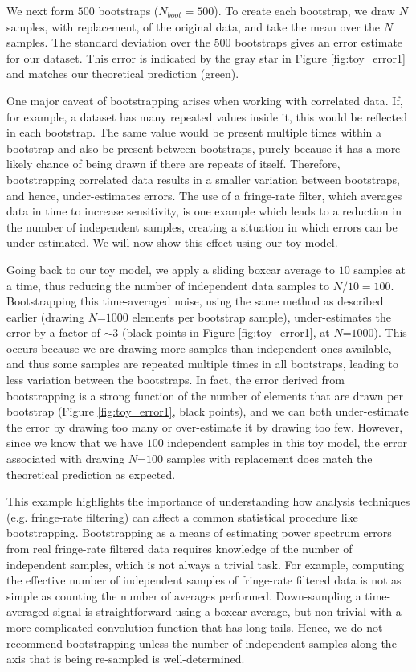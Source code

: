 \documentclass[preprint2,numberedappendix,tighten]{aastex6}  %
\begin{document}
We next form $500$ bootstraps ($N_{boot} = 500$). To create each bootstrap, we draw $N$ samples, with replacement, of the 
original data, and take the mean over the $N$ samples. The standard deviation over the $500$ bootstraps gives an error 
estimate for our dataset. This error is indicated by the gray star in Figure \ref{fig:toy_error1} and matches our theoretical 
prediction (green).

One major caveat of bootstrapping arises when working with correlated data. If, for example, a dataset has many repeated 
values inside it, this would be reflected in each bootstrap. The same value would be present multiple times within a bootstrap 
and also be present between bootstraps, purely because it has a more likely chance of being drawn if there are repeats of 
itself. Therefore, bootstrapping correlated data results in a smaller variation between bootstraps, and hence, under-estimates 
errors. The use of a fringe-rate filter, which averages data in time to increase sensitivity, is one example which leads to a 
reduction in the number of independent samples, creating a situation in which errors can be under-estimated. We will now show 
this effect using our toy model.

Going back to our toy model, we apply a sliding boxcar average to $10$ samples at a time, thus reducing the number of 
independent data samples to $N/10 = 100$. Bootstrapping this time-averaged noise, using the same method as described 
earlier (drawing $N$=$1000$ elements per bootstrap sample), under-estimates the error by a factor of $\sim3$ (black points in Figure \ref{fig:toy_error1}, at $N$=$1000$). This occurs 
because we are drawing more samples than independent ones available, and thus some samples are repeated multiple times 
in all bootstraps, leading to less variation between the bootstraps. In fact, the error derived from bootstrapping is a strong 
function of the number of elements that are drawn per bootstrap (Figure \ref{fig:toy_error1}, black points), and we can both 
under-estimate the error by drawing too many or over-estimate it by drawing too few. However, since we know that we have $100$ 
independent samples in this toy model, the error associated with drawing $N$=$100$ samples with replacement does match the theoretical prediction 
as expected.

This example highlights the importance of understanding how analysis techniques (e.g. fringe-rate filtering) can affect a 
common statistical procedure like bootstrapping. Bootstrapping as a means of estimating power spectrum errors from real 
fringe-rate filtered data requires knowledge of the number of independent samples, which is not always a trivial task. For 
example, computing the effective number of independent samples of fringe-rate filtered data is not as simple as counting the 
number of averages performed. Down-sampling a time-averaged signal is straightforward using a boxcar average, but non-trivial with a more complicated convolution function that has long tails. Hence, we do not recommend bootstrapping unless the 
number of independent samples along the axis that is being re-sampled is well-determined.
\end{document}
